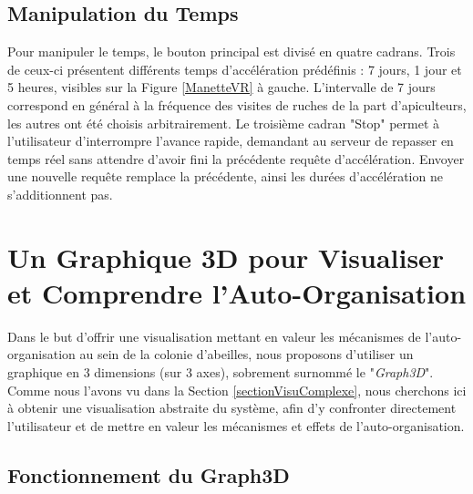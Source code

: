 		\subsection{Manipulation du Temps}
		
		Pour manipuler le temps, le bouton principal est divisé en quatre cadrans. Trois de ceux-ci présentent différents temps d'accélération prédéfinis : 7 jours, 1 jour et 5 heures, visibles sur la Figure \ref{ManetteVR} à gauche. L'intervalle de 7 jours correspond en général à la fréquence des visites de ruches de la part d'apiculteurs, les autres ont été choisis arbitrairement. Le troisième cadran "Stop" permet à l'utilisateur d'interrompre l'avance rapide, demandant au serveur de repasser en temps réel sans attendre d'avoir fini la précédente requête d'accélération. Envoyer une nouvelle requête remplace la précédente, ainsi les durées d'accélération ne s'additionnent pas.
		
	\section{Un Graphique 3D pour Visualiser et Comprendre l'Auto-Organisation}
	\label{Manip3D}
		Dans le but d'offrir une visualisation mettant en valeur les mécanismes de l'auto-organisation au sein de la colonie d'abeilles, nous proposons d'utiliser un graphique en 3 dimensions (sur 3 axes), sobrement surnommé le "\textit{Graph3D}". Comme nous l'avons vu dans la Section \ref{sectionVisuComplexe}, nous cherchons ici à obtenir une visualisation abstraite du système, afin d'y confronter directement l'utilisateur et de mettre en valeur les mécanismes et effets de l'auto-organisation.
		
		\subsection{Fonctionnement du Graph3D}
		
